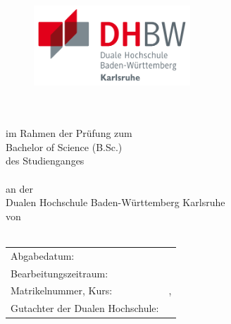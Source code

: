 \thispagestyle{empty}
\begin{titlepage}
\enlargethispage{4cm}

\begin{figure}           %
	 \vspace*{-10mm} %

	\begin{minipage}{0.49\textwidth}
		\flushleft
		\includegraphics[height=3cm]{Bilder/Logos/Logo_DHBW.pdf} 
	\end{minipage}
	\hfill
\end{figure} 
\vspace*{0.2cm}

\begin{center}
	\huge{\textbf{\titel}}\\[1cm]
	\Large{\textbf{\arbeit}}\\[0.5cm]
	\normalsize{im Rahmen der Prüfung zum} \\[0.2cm] 
	\Large{Bachelor of Science (B.Sc.)}\\[0.2cm]
	\normalsize{des Studienganges} \\ [0.2cm]
	\Large{\studiengang}\\[1ex]
	\normalsize{an der} \\ [0.2cm]
	\Large{Dualen Hochschule Baden-Württemberg Karlsruhe}\\[0.2cm]
	\normalsize{von}\\[0.5cm] \Large{\textbf{\autor}} \\
\end{center}

\begin{center}
	\vfill
	\begin{tabular}{ll}
		Abgabedatum:                     & \abgabe \\[0.2cm]
		Bearbeitungszeitraum:            & \bearbeitungszeitraum \\ [0.2cm]
		Matrikelnummer, Kurs:            & \matrikelnr , \kurs \\[0.2cm]
		Gutachter der Dualen Hochschule: & \betreuerDhbw \\[2cm]
	\end{tabular} 
\end{center}
\end{titlepage}
